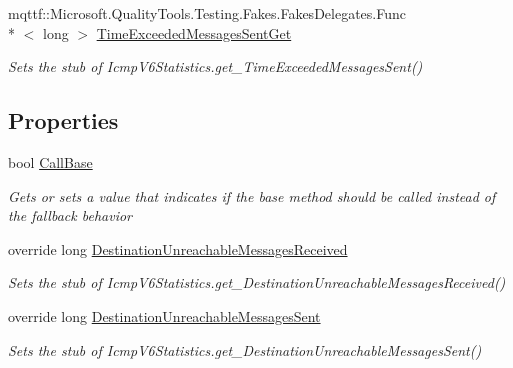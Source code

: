 \begin{DoxyCompactItemize}
mqttf\-::\-Microsoft.\-Quality\-Tools.\-Testing.\-Fakes.\-Fakes\-Delegates.\-Func\\*
$<$ long $>$ \hyperlink{class_system_1_1_net_1_1_network_information_1_1_fakes_1_1_stub_icmp_v6_statistics_ac16edfdce7116d43241e0e2517027258}{Time\-Exceeded\-Messages\-Sent\-Get}
\begin{DoxyCompactList}\small\item\em Sets the stub of Icmp\-V6\-Statistics.\-get\-\_\-\-Time\-Exceeded\-Messages\-Sent()\end{DoxyCompactList}\end{DoxyCompactItemize}
\subsection*{Properties}
\begin{DoxyCompactItemize}
\item 
bool \hyperlink{class_system_1_1_net_1_1_network_information_1_1_fakes_1_1_stub_icmp_v6_statistics_ae1e06fe9f2f4fc2f5b5bf28df45279cf}{Call\-Base}
\begin{DoxyCompactList}\small\item\em Gets or sets a value that indicates if the base method should be called instead of the fallback behavior\end{DoxyCompactList}\item 
override long \hyperlink{class_system_1_1_net_1_1_network_information_1_1_fakes_1_1_stub_icmp_v6_statistics_a2322560a665648697fb50730e54e1a30}{Destination\-Unreachable\-Messages\-Received}
\begin{DoxyCompactList}\small\item\em Sets the stub of Icmp\-V6\-Statistics.\-get\-\_\-\-Destination\-Unreachable\-Messages\-Received()\end{DoxyCompactList}\item 
override long \hyperlink{class_system_1_1_net_1_1_network_information_1_1_fakes_1_1_stub_icmp_v6_statistics_ab3394805b821a1de1289faf0cd6c2fb5}{Destination\-Unreachable\-Messages\-Sent}
\begin{DoxyCompactList}\small\item\em Sets the stub of Icmp\-V6\-Statistics.\-get\-\_\-\-Destination\-Unreachable\-Messages\-Sent()\end{DoxyCompactList}\item 

\end{DoxyCompactItemize}

